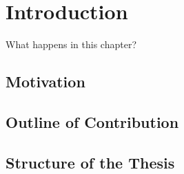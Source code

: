 \chapter{Introduction}

What happens in this chapter? 

\section{Motivation}

\section{Outline of Contribution}

\section{Structure of the Thesis}
